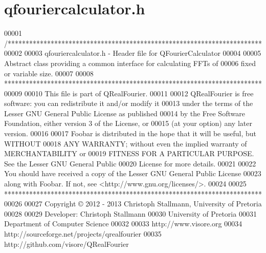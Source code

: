 \hypertarget{a00118_source}{\section{qfouriercalculator.\+h}
\label{a00118_source}
}

\begin{DoxyCode}
00001 \textcolor{comment}{/***********************************************************************}
00002 \textcolor{comment}{}
00003 \textcolor{comment}{qfouriercalculator.h - Header file for QFourierCalculator}
00004 \textcolor{comment}{}
00005 \textcolor{comment}{Abstract class providing a common interface for calculating FFTs of}
00006 \textcolor{comment}{fixed or variable size.}
00007 \textcolor{comment}{}
00008 \textcolor{comment}{************************************************************************}
00009 \textcolor{comment}{}
00010 \textcolor{comment}{This file is part of QRealFourier.}
00011 \textcolor{comment}{}
00012 \textcolor{comment}{QRealFourier is free software: you can redistribute it and/or modify it}
00013 \textcolor{comment}{under the terms of the Lesser GNU General Public License as published}
00014 \textcolor{comment}{by the Free Software Foundation, either version 3 of the License, or}
00015 \textcolor{comment}{(at your option) any later version.}
00016 \textcolor{comment}{}
00017 \textcolor{comment}{Foobar is distributed in the hope that it will be useful, but WITHOUT}
00018 \textcolor{comment}{ANY WARRANTY; without even the implied warranty of MERCHANTABILITY or}
00019 \textcolor{comment}{FITNESS FOR A PARTICULAR PURPOSE.  See the Lesser GNU General Public}
00020 \textcolor{comment}{License for more details.}
00021 \textcolor{comment}{}
00022 \textcolor{comment}{You should have received a copy of the Lesser GNU General Public License}
00023 \textcolor{comment}{along with Foobar.  If not, see <http://www.gnu.org/licenses/>.}
00024 \textcolor{comment}{}
00025 \textcolor{comment}{************************************************************************}
00026 \textcolor{comment}{}
00027 \textcolor{comment}{Copyright © 2012 - 2013 Christoph Stallmann, University of Pretoria}
00028 \textcolor{comment}{}
00029 \textcolor{comment}{Developer: Christoph Stallmann}
00030 \textcolor{comment}{University of Pretoria}
00031 \textcolor{comment}{Department of Computer Science}
00032 \textcolor{comment}{}
00033 \textcolor{comment}{http://www.visore.org}
00034 \textcolor{comment}{http://sourceforge.net/projects/qrealfourier}
00035 \textcolor{comment}{http://github.com/visore/QRealFourier}

\end{DoxyCode}
